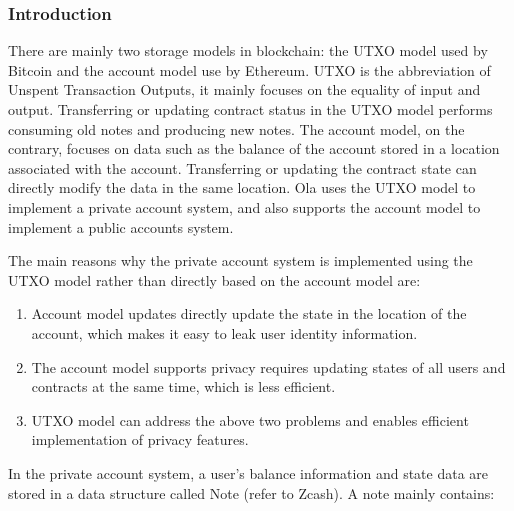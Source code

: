 \subsubsection{Introduction}\label{section: note-introduction}

There are mainly two storage models in blockchain:  the UTXO model used by Bitcoin and the account model use by Ethereum. UTXO is the abbreviation of Unspent Transaction Outputs, it mainly focuses on the equality of input and output. Transferring or updating contract status in the UTXO model performs consuming old notes and producing new notes. The account model, on the contrary, focuses on data such as the balance of the account stored in a location associated with the account. Transferring or updating the contract state can directly modify the data in the same location. Ola uses the UTXO model to implement a private account system, and also supports the account model to implement a public accounts system.

The main reasons why the private account system is implemented using the UTXO model rather than directly based on the account model are:

\begin{enumerate}
    \item Account model updates directly update the state in the location of the account, which makes it easy to leak user identity information.
    \item The account model supports privacy requires updating states of all users and contracts at the same time, which is less efficient.
    \item UTXO model can address the above two problems and enables efficient implementation of privacy features.
\end{enumerate}

In the private account system, a user's balance information and state data are stored in a data structure called Note (refer to Zcash). A note mainly contains:

